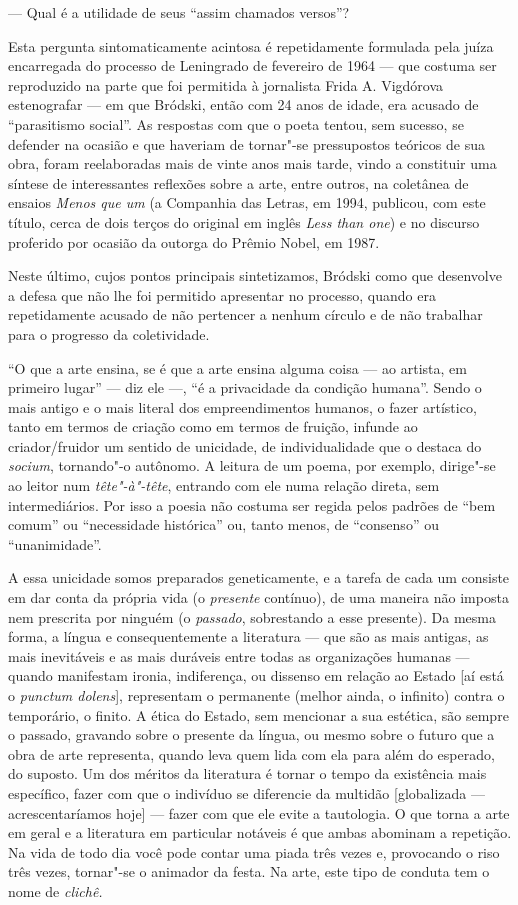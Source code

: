 {--- Qual é a utilidade de seus ``assim chamados versos''?

Esta pergunta sintomaticamente acintosa é repetidamente formulada pela
juíza encarregada do processo de Leningrado de fevereiro de 1964 ---
que costuma ser reproduzido na parte que foi permitida à jornalista Frida A.
Vigdórova estenografar --- em que Bródski, então com 24 anos de idade,
era acusado de ``parasitismo social''. As respostas com que o poeta
tentou, sem sucesso, se defender na ocasião e que haveriam de tornar"-se
pressupostos teóricos de sua obra, foram reelaboradas mais de vinte anos
mais tarde, vindo a constituir uma síntese de interessantes reflexões
sobre a arte, entre outros, na coletânea de ensaios \emph{Menos que um}
(a Companhia das Letras, em 1994, publicou, com este título, cerca de
dois terços do original em inglês \emph{Less than one}) e no
discurso proferido por ocasião da outorga do Prêmio Nobel, em 1987.

Neste último, cujos pontos principais sintetizamos, Bródski como que
desenvolve a defesa que não lhe foi permitido apresentar no processo,
quando era repetidamente acusado de não pertencer a nenhum círculo e de
não trabalhar para o progresso da coletividade.

``O que a arte ensina, se é que a arte ensina alguma coisa --- ao
artista, em primeiro lugar'' --- diz ele ---, ``é a privacidade da
condição humana''. Sendo o mais antigo e o mais literal dos
empreendimentos humanos, o fazer artístico, tanto em termos de criação
como em termos de fruição, infunde ao criador/fruidor um sentido de
unicidade, de individualidade que o destaca do \emph{socium}, tornando"-o
autônomo. A leitura de um poema, por exemplo, dirige"-se ao leitor num
\emph{tête"-à"-tête}, entrando com ele numa relação direta, sem
intermediários. Por isso a poesia não costuma ser regida pelos padrões
de ``bem comum'' ou ``necessidade histórica'' ou, tanto menos, de
``consenso'' ou ``unanimidade''.

A essa unicidade somos preparados geneticamente, e a tarefa de cada um
consiste em dar conta da própria vida (o \emph{presente} contínuo), de
uma maneira não imposta nem prescrita por ninguém (o \emph{passado},
sobrestando a esse presente). Da mesma forma, a língua e
consequentemente a literatura --- que são as mais antigas, as mais
inevitáveis e as mais duráveis entre todas as organizações humanas ---
quando manifestam ironia, indiferença, ou dissenso em relação ao Estado
[aí está o \emph{punctum dolens}], representam o permanente (melhor ainda, o infinito) contra o temporário, o finito. A ética do
Estado, sem mencionar a sua estética, são sempre o passado, gravando
sobre o presente da língua, ou mesmo sobre o futuro que a obra de arte
representa, quando leva quem lida com ela para além do esperado, do
suposto. Um dos méritos da literatura é tornar o tempo da existência
mais específico, fazer com que o indivíduo se diferencie da multidão
{[}globalizada --- acrescentaríamos hoje{]} --- fazer com que ele evite a
tautologia. O que torna a arte em geral e a literatura em particular
notáveis é que ambas abominam a repetição. Na vida de todo dia você pode
contar uma piada três vezes e, provocando o riso três vezes, tornar"-se o
animador da festa. Na arte, este tipo de conduta tem o nome de
\emph{clichê.}

}
